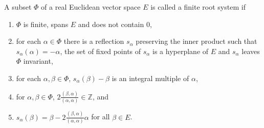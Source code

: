 A subset $\Phi$ of a real Euclidean vector space $E$ is called a finite root system
if
\begin{enumerate}[label=(\alph*)]
	\item $\Phi$ is finite, spans $E$ and does not contain $0$,
	\item for each $\alpha \in \Phi$ there is a reflection $s_\alpha$
		preserving the inner product such that $s_\alpha(\alpha) = -\alpha$,
		the set of fixed points of $s_\alpha$ is a hyperplane of $E$ and
		$s_\alpha$ leaves $\Phi$ invariant,
	\item for each $\alpha, \beta \in \Phi$,
		$s_\alpha(\beta) - \beta$ is an integral multiple of $\alpha$,
	\item for $\alpha, \beta \in \Phi$, $2\frac{(\beta, \alpha)}{(\alpha, \alpha)} \in \mathbb{Z}$, and
	\item $s_\alpha(\beta) = \beta - 2\frac{(\beta, \alpha)}{(\alpha, \alpha)}\alpha$ for
		all $\beta \in E$.
\end{enumerate}
